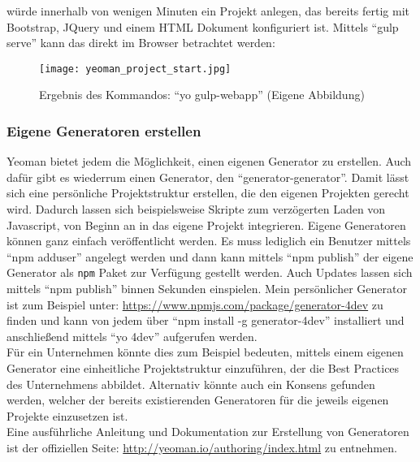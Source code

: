 		würde innerhalb von wenigen Minuten ein Projekt anlegen, das bereits fertig mit Bootstrap, JQuery und einem HTML Dokument konfiguriert ist. Mittels "`gulp serve"' kann das direkt im Browser betrachtet werden:

		\begin{figure}[htbp]
			\begin{center}
				\texttt{[image: yeoman\_project\_start.jpg]}
				\caption{Ergebnis des Kommandos: "`yo gulp-webapp"' (Eigene Abbildung)}
				\label{fig:yeoman_project_start}
			\end{center}
		\end{figure}
				
		\subsubsection{Eigene Generatoren erstellen} %
		\label{ssub:eigene_generatoren_erstellen}
			Yeoman bietet jedem die Möglichkeit, einen eigenen Generator zu erstellen. Auch dafür gibt es wiederrum einen Generator, den "`generator-generator"'. Damit lässt sich eine persönliche Projektstruktur erstellen, die den eigenen Projekten gerecht wird. Dadurch lassen sich beispielsweise Skripte zum verzögerten Laden von Javascript, von Beginn an in das eigene Projekt integrieren. Eigene Generatoren können ganz einfach veröffentlicht werden. Es muss lediglich ein Benutzer mittels "`npm adduser"' angelegt werden und dann kann mittels "`npm publish"' der eigene Generator als \texttt{npm} Paket zur Verfügung gestellt werden. Auch Updates lassen sich mittels "`npm publish"' binnen Sekunden einspielen. Mein persönlicher Generator ist zum Beispiel unter: \url{https://www.npmjs.com/package/generator-4dev} zu finden und kann von jedem über "`npm install -g generator-4dev"' installiert und anschließend mittels "`yo 4dev"' aufgerufen werden.\\

			Für ein Unternehmen könnte dies zum Beispiel bedeuten, mittels einem eigenen Generator eine einheitliche Projektstruktur einzuführen, der die Best Practices des Unternehmens abbildet. Alternativ könnte auch ein Konsens gefunden werden, welcher der bereits existierenden Generatoren für die jeweils eigenen Projekte einzusetzen ist.\\

			Eine ausführliche Anleitung und Dokumentation zur Erstellung von Generatoren ist der offiziellen Seite: \url{http://yeoman.io/authoring/index.html} zu entnehmen.
		
